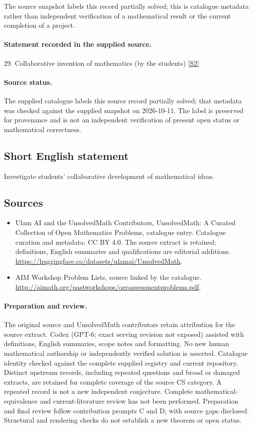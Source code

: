\documentclass[11pt]{article}
\begin{document}
The source snapshot labels this record partially solved; this is catalogue metadata rather than independent verification of a mathematical result or the current completion of a project.
\paragraph{Statement recorded in the supplied source.}
29. Collaborative invention of mathematics (by the students) \href{http://aimath.org/pastworkshops/oerassessmentproblems.pdf}{[S2]}
\paragraph{Source status.}
The supplied catalogue labels this source record partially solved; that metadata was checked against the supplied snapshot on 2026-10-11. The label is preserved for provenance and is not an independent verification of present open status or mathematical correctness.
\subsection{Short English statement}
Investigate students' collaborative development of mathematical ideas.
\subsection{Sources}
\begin{itemize}
\item[S1] Ulam AI and the UnsolvedMath Contributors, UnsolvedMath: A Curated Collection of Open Mathematics Problems, catalogue entry. Catalogue curation and metadata: CC BY 4.0. The source extract is retained; definitions, English summaries and qualifications are editorial additions.
\url{https://huggingface.co/datasets/ulamai/UnsolvedMath}.
\item[S2] AIM Workshop Problem Lists, source linked by the catalogue.
\url{http://aimath.org/pastworkshops/oerassessmentproblems.pdf}.
\end{itemize}
\paragraph{Preparation and review.}
The original source and UnsolvedMath contributors retain attribution for the source extract. Codex (GPT-6; exact serving revision not exposed) assisted with definitions, English summaries, scope notes and formatting. No new human mathematical authorship or independently verified solution is asserted. Catalogue identity checked against the complete supplied registry and current repository. Distinct upstream records, including repeated questions and broad or damaged extracts, are retained for complete coverage of the source CS category. A repeated record is not a new independent conjecture. Complete mathematical-equivalence and current-literature review has not been performed. Preparation and final review follow contribution prompts C and D, with source gaps disclosed. Structural and rendering checks do not establish a new theorem or open status.
\label{end:statement}
\end{document}
